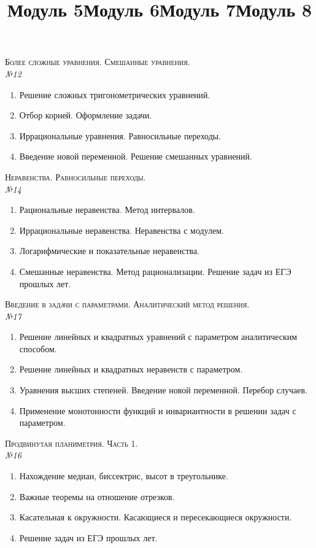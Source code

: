 \documentclass[12pt, a4paper]{article}
\begin{document}
\newpage
\title{Модуль 5}
\textsc{Более сложные уравнения. Смешанные уравнения.}\\[0.5em]
\textit{№12}
\begin{enumerate}[label=\textbf{\arabic*})]
	\item Решение сложных тригонометрических уравнений.
	\item Отбор корней. Оформление задачи.
	\item Иррациональные уравнения. Равносильные переходы.
	\item Введение новой переменной. Решение смешанных уравнений.
\end{enumerate}
\title{Модуль 6}
\textsc{Неравенства. Равносильные переходы.}\\[0.5em]
\textit{№14}
\begin{enumerate}[label=\textbf{\arabic*})]
	\item Рациональные неравенства. Метод интервалов.
	\item Иррациональные неравенства. Неравенства с модулем.
	\item Логарифмические и показательные неравенства.
	\item Смешанные неравенства. Метод рационализации. Решение задач из ЕГЭ прошлых лет.
\end{enumerate}
\title{Модуль 7}
\textsc{Введение в задачи с параметрами. Аналитический метод решения.}\\[0.5em]
\textit{№17}
\begin{enumerate}[label=\textbf{\arabic*})]
	\item Решение линейных и квадратных уравнений с параметром аналитическим способом.
	\item Решение линейных и квадратных неравенств с параметром.
	\item Уравнения высших степеней. Введение новой переменной. Перебор случаев.
	\item Применение монотонности функций и инвариантности в решении задач с параметром.
\end{enumerate}
\title{Модуль 8}
\textsc{Продвинутая планиметрия. Часть 1.}\\[0.5em]
\textit{№16}
\begin{enumerate}[label=\textbf{\arabic*})]
	\item Нахождение медиан, биссектрис, высот в треугольнике.
	\item Важные теоремы на отношение отрезков.
	\item Касательная к окружности. Касающиеся и пересекающиеся окружности.
	\item Решение задач из ЕГЭ прошлых лет.
\end{enumerate}
\end{document}
